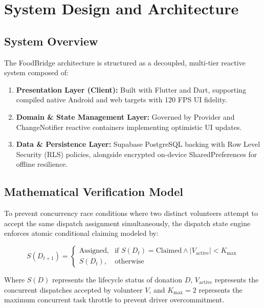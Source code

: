 \chapter{System Design and Architecture}
\label{ch:system_architecture}

\section{System Overview}
The FoodBridge architecture is structured as a decoupled, multi-tier reactive system composed of:
\begin{enumerate}
    \item \textbf{Presentation Layer (Client):} Built with Flutter and Dart, supporting compiled native Android and web targets with 120 FPS UI fidelity.
    \item \textbf{Domain & State Management Layer:} Governed by Provider and ChangeNotifier reactive containers implementing optimistic UI updates.
    \item \textbf{Data & Persistence Layer:} Supabase PostgreSQL backing with Row Level Security (RLS) policies, alongside encrypted on-device SharedPreferences for offline resilience.
\end{enumerate}

\section{Mathematical Verification Model}
To prevent concurrency race conditions where two distinct volunteers attempt to accept the same dispatch assignment simultaneously, the dispatch state engine enforces atomic conditional claiming modeled by:

\begin{equation}
    S(D_{t+1}) = 
    \begin{cases} 
        \text{Assigned}, & \text{if } S(D_t) = \text{Claimed} \land |V_{\text{active}}| < K_{\text{max}} \\ 
        S(D_t), & \text{otherwise} 
    \end{cases}
    \label{eq:concurrency}
\end{equation}

Where $S(D)$ represents the lifecycle status of donation $D$, $V_{\text{active}}$ represents the concurrent dispatches accepted by volunteer $V$, and $K_{\text{max}} = 2$ represents the maximum concurrent task throttle to prevent driver overcommitment.

